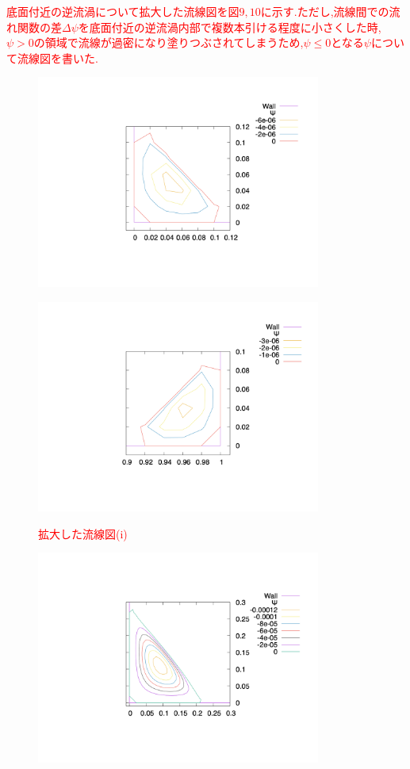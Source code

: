 \documentclass[upLaTeX,a4paper]{jsarticle}
\begin{document}
\textcolor{red}{
底面付近の逆流渦について拡大した流線図を図$9,10$に示す.ただし,流線間での流れ関数の差$\varDelta\psi$を底面付近の逆流渦内部で複数本引ける程度に小さくした時,
$\psi>0$の領域で流線が過密になり塗りつぶされてしまうため,$\psi\leq0$となる$\psi$について流線図を書いた.
\begin{figure}[H]
  \begin{minipage}[b]{0.50\linewidth}
    \centering
    \includegraphics[height=7cm, clip, trim=300 150 100 50]{outputs/img/stream_line_corner1_re50.png}
    \label{ラベル1}
  \end{minipage}
  \begin{minipage}[b]{0.50\linewidth}
    \centering
    \includegraphics[height=7cm, clip, trim=300 150 100 50]{outputs/img/stream_line_corner2_re50.png}
    \label{ラベル2}
  \end{minipage}
  \caption{拡大した流線図(i)}\label{ラベル}
\end{figure}
\begin{figure}[H]
  \begin{minipage}[c]{0.5\linewidth}
    \centering
    \includegraphics[height=7cm, clip, trim=300 150 100 50]{outputs/img/stream_line_corner1_re200.png}

\end{minipage}
\end{figure}}
\end{document}
